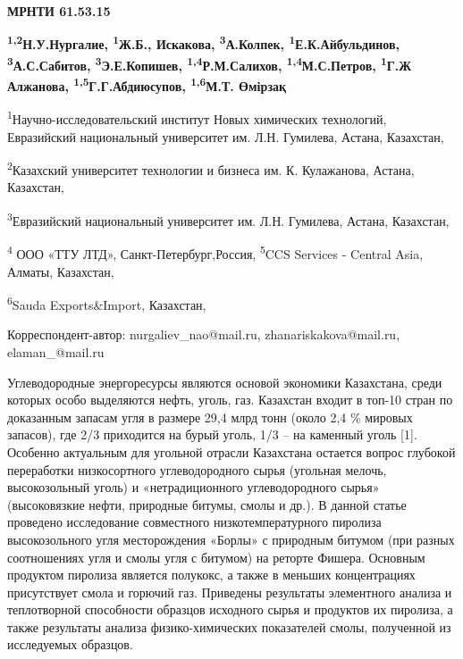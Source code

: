 \newpage
{\bfseries МРНТИ 61.53.15}


\begin{center}
{\bfseries \textsuperscript{1,2}Н.У.Нургалие, \textsuperscript{1}Ж.Б., Искакова, \textsuperscript{3}А.Колпек, \textsuperscript{1}Е.К.Айбульдинов, \textsuperscript{3}А.С.Сабитов, \textsuperscript{3}Э.Е.Копишев, \textsuperscript{1,4}Р.М.Салихов, \textsuperscript{1,4}М.С.Петров, \textsuperscript{1}Г.Ж Алжанова, \textsuperscript{1,5}Г.Г.Абдиюсупов, \textsuperscript{1,6}М.Т. Өмірзақ}

\textsuperscript{1}Научно-исследовательский институт Новых химических
технологий, Евразийский национальный университет им. Л.Н. Гумилева,
Астана, Казахстан,

\textsuperscript{2}Казахский университет технологии и бизнеса им. К.
Кулажанова, Астана, Казахстан,

\textsuperscript{3}Евразийский национальный университет им. Л.Н.
Гумилева, Астана, Казахстан,

\textsuperscript{4} ООО «ТТУ ЛТД», Санкт-Петербург,Россия,
\textsuperscript{5}CCS Services - Central Asia, Алматы, Казахстан,

\textsuperscript{6}Sauda Exports\&Import, Казахстан,

Корреспондент-автор: nurgaliev\_nao@mail.ru, zhanariskakova@mail.ru,
elaman\_@mail.ru
\end{center}

Углеводородные энергоре­сурсы являются основой экономики Казахстана,
среди которых особо выделяются нефть, уголь, газ. Казахстан входит в
топ-10 стран по доказанным запасам угля в размере 29,4 млрд тонн (около
2,4 \% мировых запасов), где 2/3 приходится на бурый уголь, 1/3 -- на
каменный уголь {[}1{]}. Особенно актуальным для угольной отрасли
Казахстана остается вопрос глубокой переработки низкосортного
углеводородного сырья (угольная мелочь, высокозольный уголь) и
«нетрадиционного углеводородного сырья» (высоковязкие нефти, природные
битумы, смолы и др.). В данной статье проведено исследование совместного
низкотемпературного пиролиза высокозольного угля месторождения «Борлы» с
природным битумом (при разных соотношениях угля и смолы угля с битумом)
на реторте Фишера. Основным продуктом пиролиза является полукокс, а
также в меньших концентрациях присутствует смола и горючий газ.
Приведены результаты элементного анализа и теплотворной способности
образцов исходного сырья и продуктов их пиролиза, а также результаты
анализа физико-химических показателей смолы, полученной из исследуемых
образцов.

